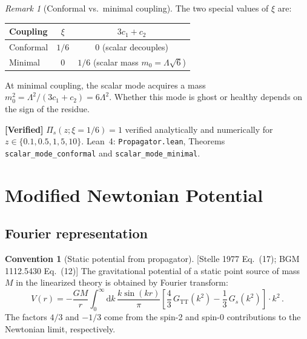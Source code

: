 \documentclass[12pt,a4paper]{article}
\theoremstyle{definition}
\newtheorem{convention}[proposition]{Convention}
\theoremstyle{remark}
\newtheorem{remark}[proposition]{Remark}
\newcommand{\dd}{\mathrm{d}}
\newcommand{\fromlit}[1]{\textcolor{blue!70!black}{\textsf{[#1]}}}
\newcommand{\verified}[1]{%
  \par\smallskip\noindent
  \colorbox{green!10}{\parbox{\dimexpr\linewidth-2\fboxsep}{%
    \textcolor{green!50!black}{\textbf{[Verified]}} #1}}%
  \par\smallskip}
\begin{document}
\begin{remark}[Conformal vs.\ minimal coupling]
The two special values of $\xi$ are:
\begin{center}
\begin{tabular}{lcc}
\toprule
Coupling & $\xi$ & $3c_1+c_2$ \\
\midrule
Conformal & $1/6$ & $0$ (scalar decouples) \\
Minimal & $0$ & $1/6$ (scalar mass $m_0 = \Lambda\sqrt{6}$) \\
\bottomrule
\end{tabular}
\end{center}
At minimal coupling, the scalar mode acquires a mass
$m_0^2 = \Lambda^2/(3c_1+c_2) = 6\Lambda^2$.  Whether this
mode is ghost or healthy depends on the sign of the residue.
\end{remark}

\verified{$\Pi_s(z;\xi=1/6) = 1$ verified analytically and
numerically for $z \in \{0.1, 0.5, 1, 5, 10\}$.
Lean~4: \texttt{Propagator.lean}, Theorems
\texttt{scalar\_mode\_conformal} and \texttt{scalar\_mode\_minimal}.}


\section{Modified Newtonian Potential}
\label{sec:newtonian}

\subsection{Fourier representation}

\begin{convention}[Static potential from propagator]
\label{conv:potential}
\fromlit{Stelle 1977 Eq.~(17); BGM 1112.5430 Eq.~(12)}
The gravitational potential of a static point source of mass $M$
in the linearized theory is obtained by Fourier transform:
\begin{equation}
  V(r) = -\frac{G M}{r}\int_0^\infty\dd k\,
  \frac{k\sin(kr)}{\pi}\left[
    \frac{4}{3}\,G_{\text{TT}}(k^2)
    - \frac{1}{3}\,G_s(k^2)
  \right]
  \cdot k^2\,.
  \label{eq:potential-fourier}
\end{equation}
The factors $4/3$ and $-1/3$ come from the spin-2 and spin-0
contributions to the Newtonian limit, respectively.
\end{convention}
\end{document}
